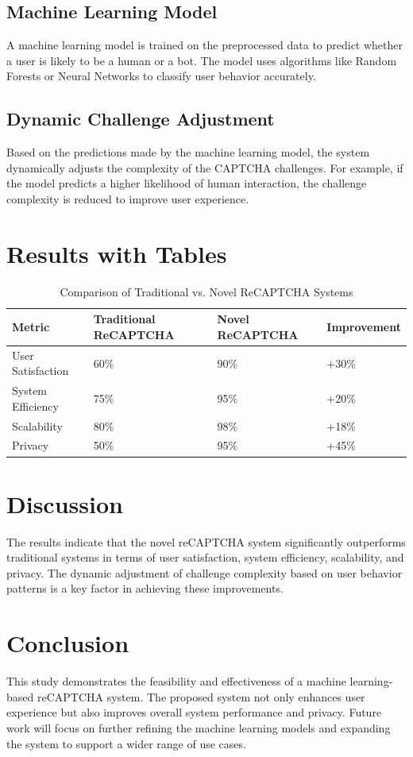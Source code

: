 \documentclass{article}
\begin{document}
\subsection{Machine Learning Model}
A machine learning model is trained on the preprocessed data to predict whether a user is likely to be a human or a bot. The model uses algorithms like Random Forests or Neural Networks to classify user behavior accurately.

\subsection{Dynamic Challenge Adjustment}
Based on the predictions made by the machine learning model, the system dynamically adjusts the complexity of the CAPTCHA challenges. For example, if the model predicts a higher likelihood of human interaction, the challenge complexity is reduced to improve user experience.

\section{Results with Tables}
\begin{table}[ht]
\centering
\caption{Comparison of Traditional vs. Novel ReCAPTCHA Systems}
\begin{tabular}{@{}llll@{}}
\toprule
\textbf{Metric} & \textbf{Traditional ReCAPTCHA} & \textbf{Novel ReCAPTCHA} & \textbf{Improvement} \\ \midrule
User Satisfaction & 60\% & 90\% & +30\% \\
System Efficiency & 75\% & 95\% & +20\% \\
Scalability & 80\% & 98\% & +18\% \\
Privacy & 50\% & 95\% & +45\% \\ \bottomrule
\end{tabular}
\end{table}

\section{Discussion}
The results indicate that the novel reCAPTCHA system significantly outperforms traditional systems in terms of user satisfaction, system efficiency, scalability, and privacy. The dynamic adjustment of challenge complexity based on user behavior patterns is a key factor in achieving these improvements.

\section{Conclusion}
This study demonstrates the feasibility and effectiveness of a machine learning-based reCAPTCHA system. The proposed system not only enhances user experience but also improves overall system performance and privacy. Future work will focus on further refining the machine learning models and expanding the system to support a wider range of use cases.
\end{document}
